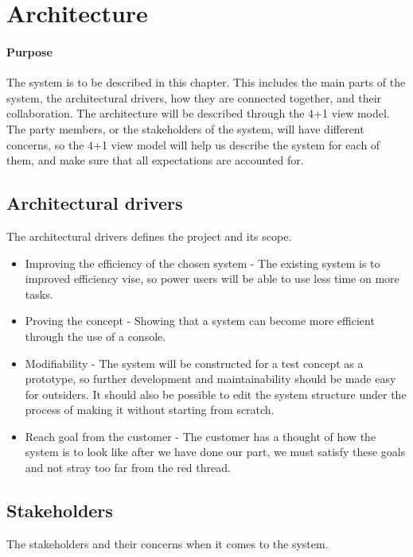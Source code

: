 \chapter{Architecture}

\minitoc

\subsubsection{Purpose}

The system is to be described in this chapter. This includes the main parts of the system, the architectural drivers, how they are connected together, and their collaboration. The architecture will be described through the 4+1 view model. The party members, or the stakeholders of the system, will have different concerns, so the 4+1 view model will help us describe the system for each of them, and make sure that all expectations are accounted for.  

\clearpage


\section{Architectural drivers}
The architectural drivers defines the project and its scope. 

\begin{itemize}
    \item Improving the efficiency of the chosen system - The existing system is to improved efficiency vise, so power users will be able to use less time on more tasks. 
    \item Proving the concept - Showing that a system can become more efficient through the use of a console. 
    \item Modifiability - The system will be constructed for a test concept as a prototype, so further development and maintainability should be made easy for outsiders. It should also be possible to edit the system structure under the process of making it without starting from scratch. 
    \item Reach goal from the customer - The customer has a thought of how the system is to look like after we have done our part, we must satisfy these goals and not stray too far from the red thread.  
\end{itemize}


\section{Stakeholders}
The stakeholders and their concerns when it comes to the system.

